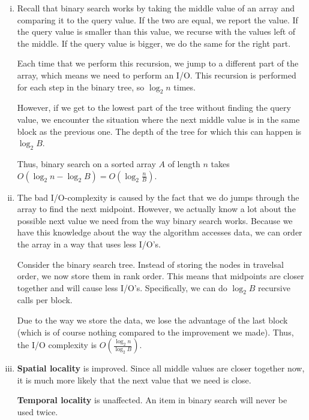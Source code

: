 \begin{enumerate}[(i)]
	\item Recall that binary search works by taking the middle value of an array and comparing it to the query value.
		If the two are equal, we report the value.
		If the query value is smaller than this value, we recurse with the values left of the middle.
		If the query value is bigger, we do the same for the right part.

		Each time that we perform this recursion, we jump to a different part of the array, which means we need to perform an I/O.
		This recursion is performed for each step in the binary tree, so $\log_2{n}$ times.

		However, if we get to the lowest part of the tree without finding the query value, we encounter the situation where the next middle value is in the same block as the previous one.
		The depth of the tree for which this can happen is $\log_2{B}$.

		Thus, binary search on a sorted array $A$ of length $n$ takes $O(\log_2{n} - \log_2{B}) = O(\log_2{\frac{n}{B}})$.
	\item The bad I/O-complexity is caused by the fact that we do jumps through the array to find the next midpoint.
		However, we actually know a lot about the possible next value we need from the way binary search works.
		Because we have this knowledge about the way the algorithm accesses data, we can order the array in a way that uses less I/O's.

		Consider the binary search tree.
		Instead of storing the nodes in travelsal order, we now store them in rank order.
		This means that midpoints are closer together and will cause less I/O's.
		Specifically, we can do $\log_2{B}$ recursive calls per block.

		Due to the way we store the data, we lose the advantage of the last block (which is of course nothing compared to the improvement we made).
		Thus, the I/O complexity is $O(\frac{\log_2{n}}{\log_2{B}})$.
	\item \textbf{Spatial locality} is improved. Since all middle values are closer together now, it is much more likely that the next value that we need is close.

		\textbf{Temporal locality} is unaffected. An item in binary search will never be used twice.
\end{enumerate}
